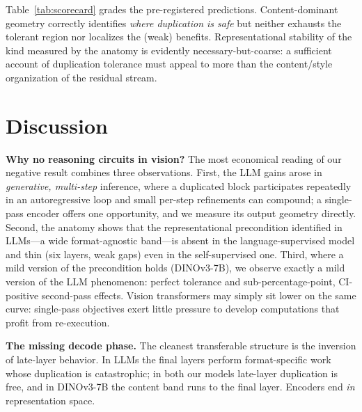\documentclass{article}
\newcommand{\dino}{DINOv3-7B}
\begin{document}
Table~\ref{tab:scorecard} grades the pre-registered predictions.
Content-dominant geometry correctly identifies \emph{where duplication is
safe} but neither exhausts the tolerant region nor localizes the (weak)
benefits. Representational stability of the kind measured by the anatomy
is evidently necessary-but-coarse: a sufficient account of duplication
tolerance must appeal to more than the content/style organization of the
residual stream.

\section{Discussion}
\label{sec:discussion}

\textbf{Why no reasoning circuits in vision?} The most economical reading
of our negative result combines three observations. First, the LLM gains
arose in \emph{generative, multi-step} inference, where a duplicated
block participates repeatedly in an autoregressive loop and small
per-step refinements can compound; a single-pass encoder offers one
opportunity, and we measure its output geometry directly. Second, the
anatomy shows that the representational precondition identified in
LLMs---a wide format-agnostic band---is absent in the
language-supervised model and thin (six layers, weak gaps) even in the
self-supervised one. Third, where a mild version of the precondition
holds (\dino{}), we observe exactly a mild version of the LLM
phenomenon: perfect tolerance and sub-percentage-point, CI-positive
second-pass effects. Vision transformers may simply sit lower on the same curve: single-pass
objectives exert little pressure to develop computations that profit from
re-execution.

\textbf{The missing decode phase.} The cleanest transferable structure is
the inversion of late-layer behavior. In LLMs the final layers perform
format-specific work whose duplication is catastrophic; in both our
models late-layer duplication is free, and in \dino{} the content band
runs to the final layer. Encoders end \emph{in} representation space.
\end{document}
